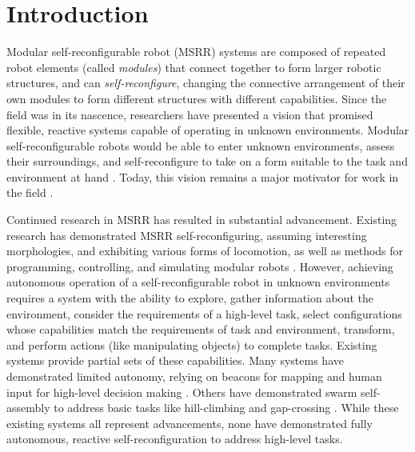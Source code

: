 \documentclass[12pt]{article}
\begin{document}

%
\section{Introduction}
\label{sec:introduction}
%
Modular self-reconfigurable robot (MSRR) systems are composed of repeated robot elements (called \textit{modules}) that connect together to form larger robotic structures, and can \textit{self-reconfigure}, changing the connective arrangement of their own modules to form different structures with different capabilities.  Since the field was in its nascence, researchers have presented a vision that promised flexible, reactive systems capable of operating in unknown environments.  Modular self-reconfigurable robots would be able to enter unknown environments, assess their surroundings, and self-reconfigure to take on a form suitable to the task and environment at hand \cite{Yim1994}.  Today, this vision remains a major motivator for work in the field \cite{Yim2007a}.  

Continued research in  MSRR has resulted in substantial advancement.  Existing research has demonstrated MSRR self-reconfiguring, assuming interesting morphologies, and exhibiting various forms of locomotion, as well as methods for programming, controlling, and simulating modular robots \cite{Yim1994, Yim2007, Rubenstein2004,Murata2006,Paulos2015,Jing2016, fukuda1990cellular, murata1994self, chirikjian1994kinematics, dutta2018distributed,ryland2010design, wolfe2012m, romanishin20153d, mantzouratos2015embeddability}.
However, achieving autonomous operation of a self-reconfigurable robot in unknown environments requires a system with the ability to explore, gather information about the environment, consider the requirements of a high-level task, select configurations whose capabilities match the requirements of task and environment, transform, and perform actions (like manipulating objects) to complete tasks.  Existing systems provide partial sets of these capabilities.
Many systems have demonstrated limited autonomy, relying on beacons for mapping  \cite{Grabowski2000,Dorigo2005} and human input for high-level decision making \cite{Mondada2005,Dorigo2013}. Others have demonstrated swarm self-assembly to address basic tasks like hill-climbing and gap-crossing \cite{gross2006autonomous,o2010self}.  While these existing systems all represent advancements, none have demonstrated fully autonomous, reactive self-reconfiguration to address high-level tasks.
\end{document}
